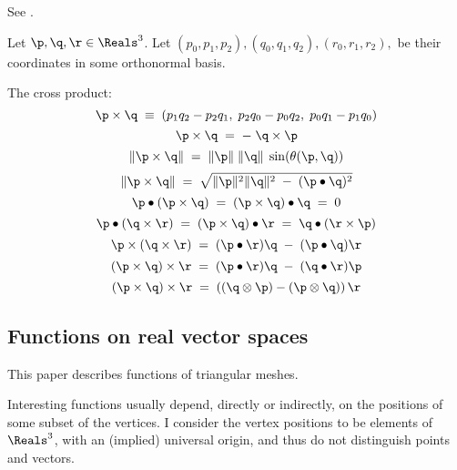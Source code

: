 See \cite[p. 85, ex. 4-9]{Spivak:1965:CalculusOnManifolds}.

Let $\p, \q, \r \in \Reals^3$.
Let $(p_0,p_1,p_2), (q_0,q_1,q_2), (r_0,r_1,r_2), $ be their coordinates
in some orthonormal basis.

The cross product:
\begin{equation}
\p \times \q  \; \equiv \; (p_1 q_2 - p_2 q_1, \; p_2 q_0 - p_0 q_2, \; p_0 q_1 - p_1 q_0)
\end{equation}
\begin{equation}
\p \times \q  \; = \; - \; \q \times \p
\end{equation}
\begin{equation}
\| \p \times \q \| \; = \; \| \p \| \; \| \q \| \; \sin(\theta(\p,\q))
\end{equation}
\begin{equation}
\| \p \times \q \|  \; = \;  \sqrt{\| \p \|^2 \| \q \|^2 \; - \; (\p \bullet \q)^2}
\end{equation}
\begin{equation}
\p \bullet ( \p \times \q ) \; = \; ( \p \times \q ) \bullet \q \; = \; 0
\end{equation}
\begin{equation}
\label{eq:dot_cross}
\p \bullet ( \q \times \r ) \; = \; ( \p \times \q ) \bullet \r \; = \; \q \bullet ( \r \times \p )
\end{equation}
\begin{equation}
\p \times ( \q \times \r ) \; = \; ( \p \bullet \r ) \q \; - \; (\p \bullet \q) \r
\end{equation}
\begin{equation}
( \p \times \q ) \times \r \; = \; ( \p \bullet \r ) \q \; - \; (\q \bullet \r) \p
\end{equation}
\begin{equation}
( \p \times \q ) \times \r \; = \; \left((\q \otimes \p) - (\p \otimes \q)\right) \r
\end{equation}



\subsection{Functions on real vector spaces}
\label{sec:functions}

This paper describes functions of triangular meshes.

Interesting functions usually depend, directly or indirectly,
on the positions of some subset of the vertices.
I consider the vertex positions to be elements of $\Reals^3$,
with an (implied) universal origin,
and thus do not distinguish points and vectors.

